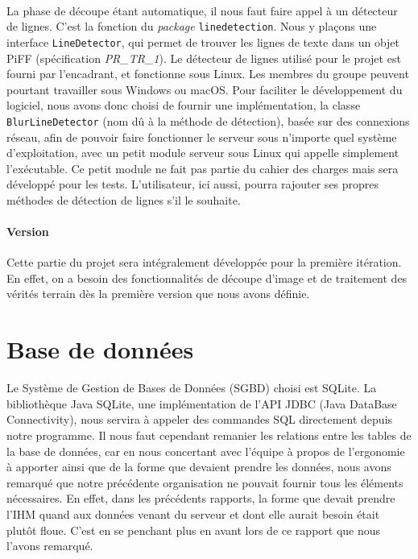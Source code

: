 \paragraph{}
La phase de découpe étant automatique, il nous faut faire appel à un détecteur de lignes. C'est la fonction du \textit{package} \texttt{linedetection}. Nous y plaçons une interface \texttt{LineDetector}, qui permet de trouver les lignes de texte dans un objet PiFF (spécification \textit{PR\_TR\_1}). Le détecteur de lignes utilisé pour le projet est fourni par l'encadrant, et fonctionne sous Linux. Les membres du groupe peuvent pourtant travailler sous Windows ou macOS. Pour faciliter le développement du logiciel, nous avons donc choisi de fournir une implémentation, la classe \texttt{BlurLineDetector} (nom dû à la méthode de détection), basée sur des connexions réseau, afin de pouvoir faire fonctionner le serveur sous n'importe quel système d'exploitation, avec un petit module serveur sous Linux qui appelle simplement l'exécutable. Ce petit module ne fait pas partie du cahier des charges mais sera développé pour les tests. L'utilisateur, ici aussi, pourra rajouter ses propres méthodes de détection de lignes s'il le souhaite.

\paragraph{Version}
Cette partie du projet sera intégralement développée pour la première itération. En effet, on a besoin des fonctionnalités de découpe d'image et de traitement des vérités terrain dès la première version que nous avons définie.

\section{Base de données}

Le Système de Gestion de Bases de Données (SGBD) choisi est SQLite. La bibliothèque Java SQLite, une implémentation de l'API JDBC (Java DataBase Connectivity), nous servira à appeler des commandes SQL directement depuis notre programme.
Il nous faut cependant remanier les relations entre les tables de la base de données, car en nous concertant avec l'équipe à propos de l'ergonomie à apporter ainsi que de la forme que devaient prendre les données, nous avons remarqué que notre précédente organisation ne pouvait fournir tous les éléments nécessaires. En effet, dans les précédents rapports, la forme que devait prendre l'IHM quand aux données venant du serveur et dont elle aurait besoin était plutôt floue. C'est en se penchant plus en avant lors de ce rapport que nous l'avons remarqué.


